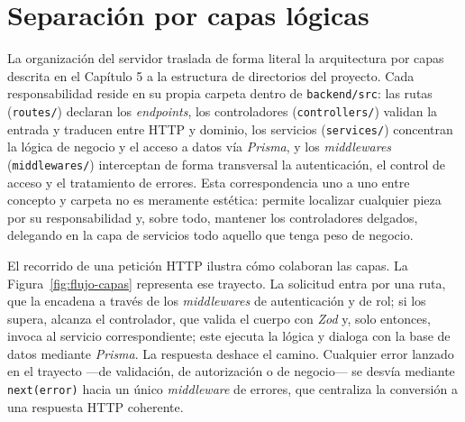 \documentclass[11pt,oneside,spanish,listoffigures,listoftables]{tfgetsinf}
\begin{document}
\section{Separación por capas lógicas}

La organización del servidor traslada de forma literal la arquitectura por capas descrita en el Capítulo 5 a la estructura de directorios del proyecto. Cada responsabilidad reside en su propia carpeta dentro de \texttt{backend/src}: las rutas (\texttt{routes/}) declaran los \textit{endpoints}, los controladores (\texttt{controllers/}) validan la entrada y traducen entre HTTP y dominio, los servicios (\texttt{services/}) concentran la lógica de negocio y el acceso a datos vía \textit{Prisma}, y los \textit{middlewares} (\texttt{middlewares/}) interceptan de forma transversal la autenticación, el control de acceso y el tratamiento de errores. Esta correspondencia uno a uno entre concepto y carpeta no es meramente estética: permite localizar cualquier pieza por su responsabilidad y, sobre todo, mantener los controladores delgados, delegando en la capa de servicios todo aquello que tenga peso de negocio.

El recorrido de una petición HTTP ilustra cómo colaboran las capas. La Figura~\ref{fig:flujo-capas} representa ese trayecto. La solicitud entra por una ruta, que la encadena a través de los \textit{middlewares} de autenticación y de rol; si los supera, alcanza el controlador, que valida el cuerpo con \textit{Zod} y, solo entonces, invoca al servicio correspondiente; este ejecuta la lógica y dialoga con la base de datos mediante \textit{Prisma}. La respuesta deshace el camino. Cualquier error lanzado en el trayecto —de validación, de autorización o de negocio— se desvía mediante \texttt{next(error)} hacia un único \textit{middleware} de errores, que centraliza la conversión a una respuesta HTTP coherente.
\end{document}
